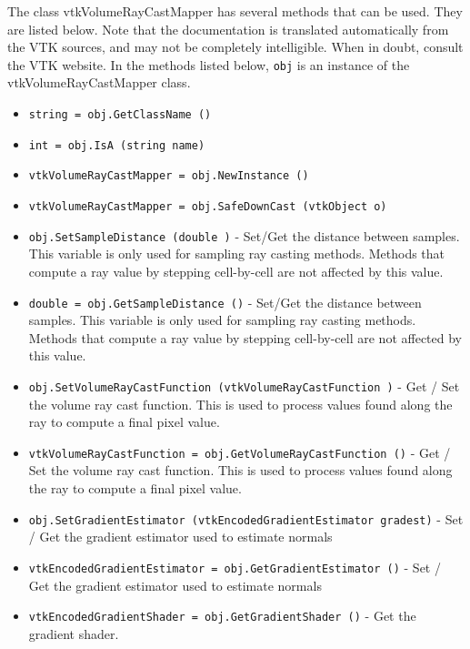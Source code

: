 The class vtkVolumeRayCastMapper has several methods that can be used.
  They are listed below.
Note that the documentation is translated automatically from the VTK sources,
and may not be completely intelligible.  When in doubt, consult the VTK website.
In the methods listed below, \verb|obj| is an instance of the vtkVolumeRayCastMapper class.
\begin{itemize}
\item  \verb|string = obj.GetClassName ()|

\item  \verb|int = obj.IsA (string name)|

\item  \verb|vtkVolumeRayCastMapper = obj.NewInstance ()|

\item  \verb|vtkVolumeRayCastMapper = obj.SafeDownCast (vtkObject o)|

\item  \verb|obj.SetSampleDistance (double )| -  Set/Get the distance between samples.  This variable is only
 used for sampling ray casting methods.  Methods that compute
 a ray value by stepping cell-by-cell are not affected by this
 value. 

\item  \verb|double = obj.GetSampleDistance ()| -  Set/Get the distance between samples.  This variable is only
 used for sampling ray casting methods.  Methods that compute
 a ray value by stepping cell-by-cell are not affected by this
 value. 

\item  \verb|obj.SetVolumeRayCastFunction (vtkVolumeRayCastFunction )| -  Get / Set the volume ray cast function. This is used to process
 values found along the ray to compute a final pixel value.

\item  \verb|vtkVolumeRayCastFunction = obj.GetVolumeRayCastFunction ()| -  Get / Set the volume ray cast function. This is used to process
 values found along the ray to compute a final pixel value.

\item  \verb|obj.SetGradientEstimator (vtkEncodedGradientEstimator gradest)| -  Set / Get the gradient estimator used to estimate normals

\item  \verb|vtkEncodedGradientEstimator = obj.GetGradientEstimator ()| -  Set / Get the gradient estimator used to estimate normals

\item  \verb|vtkEncodedGradientShader = obj.GetGradientShader ()| -  Get the gradient shader.


\end{itemize}
